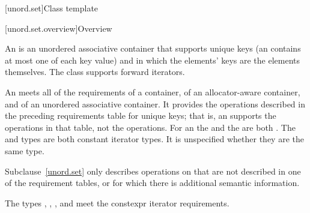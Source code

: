 [unord.set]{Class template }%

[unord.set.overview]{Overview}

\pnum
{}%
%
An  is an unordered associative container that
supports unique keys (an  contains at most one of each
key value) and in which the elements' keys are the elements
themselves.
The  class
supports forward iterators.

\pnum
An  meets all of the requirements
of a container,
of an allocator-aware container, and
of an unordered associative container.
It provides the operations described in the preceding requirements table for unique keys;
that is, an  supports the  operations in that table,
not the  operations.
For an  the 
and the  are both .
The  and  types are both constant iterator types.
It is unspecified whether they are the same type.

\pnum
Subclause~\ref{unord.set} only describes operations on  that
are not described in one of the requirement tables, or for which there
is additional semantic information.

\pnum
The types , ,
, and  meet
the constexpr iterator requirements.

